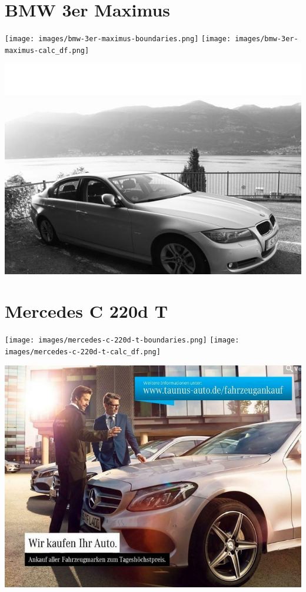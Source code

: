 \documentclass[landscape, DIV=99]{scrartcl}
\begin{document}
\twocolumn

\section*{BMW 3er Maximus}
\begin{center}
\texttt{[image: images/bmw-3er-maximus-boundaries.png]}
\null
\vspace{0.5cm}
\texttt{[image: images/bmw-3er-maximus-calc\_df.png]}
\end{center}

\pagebreak
\null
\vspace{2cm}
\begin{center}
\includegraphics[width=0.9\columnwidth]{cars/bmw-3er-maximus.png}
\end{center}

\pagebreak


\twocolumn

\section*{Mercedes C 220d T}
\begin{center}
\texttt{[image: images/mercedes-c-220d-t-boundaries.png]}
\null
\vspace{0.5cm}
\texttt{[image: images/mercedes-c-220d-t-calc\_df.png]}
\end{center}

\pagebreak
\null
\vspace{2cm}
\begin{center}
\includegraphics[width=0.9\columnwidth]{cars/mercedes-c-220d-t.png}
\end{center}
\end{document}
